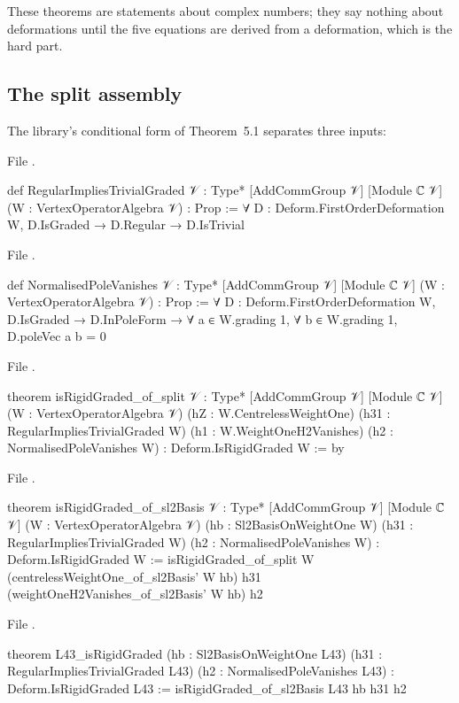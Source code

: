 These theorems are statements about complex numbers; they say nothing about deformations until
the five equations are derived from a deformation, which is the hard part.

\subsection{The split assembly}

The library's conditional form of Theorem~5.1 separates three inputs:

\noindent File .
\begin{leancode}
def RegularImpliesTrivialGraded {𝒱 : Type*} [AddCommGroup 𝒱] [Module ℂ 𝒱]
    (W : VertexOperatorAlgebra 𝒱) : Prop :=
  ∀ D : Deform.FirstOrderDeformation W, D.IsGraded → D.Regular → D.IsTrivial
\end{leancode}
\noindent File .
\begin{leancode}
def NormalisedPoleVanishes {𝒱 : Type*} [AddCommGroup 𝒱] [Module ℂ 𝒱]
    (W : VertexOperatorAlgebra 𝒱) : Prop :=
  ∀ D : Deform.FirstOrderDeformation W, D.IsGraded → D.InPoleForm →
    ∀ a ∈ W.grading 1, ∀ b ∈ W.grading 1, D.poleVec a b = 0
\end{leancode}
\noindent File .
\begin{leancode}
theorem isRigidGraded_of_split {𝒱 : Type*} [AddCommGroup 𝒱] [Module ℂ 𝒱]
    (W : VertexOperatorAlgebra 𝒱) (hZ : W.CentrelessWeightOne)
    (h31 : RegularImpliesTrivialGraded W) (h1 : W.WeightOneH2Vanishes)
    (h2 : NormalisedPoleVanishes W) : Deform.IsRigidGraded W := by
\end{leancode}
\noindent File .
\begin{leancode}
theorem isRigidGraded_of_sl2Basis {𝒱 : Type*} [AddCommGroup 𝒱] [Module ℂ 𝒱]
    (W : VertexOperatorAlgebra 𝒱) (hb : Sl2BasisOnWeightOne W)
    (h31 : RegularImpliesTrivialGraded W) (h2 : NormalisedPoleVanishes W) :
    Deform.IsRigidGraded W :=
  isRigidGraded_of_split W (centrelessWeightOne_of_sl2Basis' W hb) h31
    (weightOneH2Vanishes_of_sl2Basis' W hb) h2
\end{leancode}
\noindent File .
\begin{leancode}
theorem L43_isRigidGraded (hb : Sl2BasisOnWeightOne L43) (h31 : RegularImpliesTrivialGraded L43)
    (h2 : NormalisedPoleVanishes L43) : Deform.IsRigidGraded L43 :=
  isRigidGraded_of_sl2Basis L43 hb h31 h2
\end{leancode}


